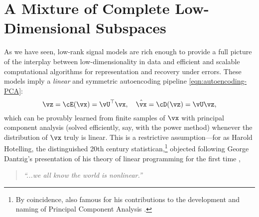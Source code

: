 \documentclass[\toplevelprefix/book-main.tex]{subfiles}
\begin{document}


\section{A Mixture of Complete Low-Dimensional Subspaces}%
\label{sec:ica}
As we have seen, low-rank signal models are rich enough to provide a full picture of the interplay between low-dimensionality in data and efficient and scalable computational algorithms for representation and recovery under errors. 
These models imply a \textit{linear} and symmetric autoencoding pipeline \eqref{eqn:autoencoding-PCA}: 
\begin{equation*}
    \vz = \cE(\vx) = \vU^\top \vx, \quad \hat{\vx} = \cD(\vz) = \vU \vz,
\end{equation*}
which can be provably learned from finite samples of $\vx$ with principal component analysis (solved efficiently, say, with the power method) whenever the distribution of $\vx$ truly is linear.
This is a restrictive assumption---for as Harold Hotelling, the distinguished 20th century statistican,\footnote{By coincidence, also famous for his contributions to the development and naming of Principal Component Analysis \cite{Hotelling1933}.} objected following George Dantzig's presentation of his theory of linear programming for the first time \cite{Dantzig2002-eh},
\begin{quote}
\centering
    \textit{``...we all know the world is nonlinear.''}
\end{quote}
\end{document}
